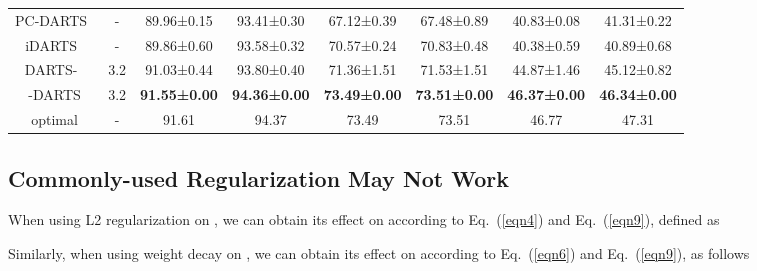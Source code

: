 \documentclass[10pt,twocolumn,letterpaper]{article}
\begin{document}
\begin{table*}[t]
\begin{center}
\begin{tabular}{cccccccc}
PC-DARTS~\cite{pc-darts}                 & -                                                                       & 89.96±0.15          & 93.41±0.30          & 67.12±0.39          & 67.48±0.89          & 40.83±0.08          & 41.31±0.22          \\
iDARTS~\cite{idarts}                   & -                                                                       & 89.86±0.60          & 93.58±0.32          & 70.57±0.24          & 70.83±0.48          & 40.38±0.59          & 40.89±0.68          \\
DARTS-~\cite{darts-}                   & 3.2                                                                     & 91.03±0.44          & 93.80±0.40          & 71.36±1.51          & 71.53±1.51          & 44.87±1.46          & 45.12±0.82          \\
-DARTS               & 3.2                                                                     & \textbf{91.55±0.00} & \textbf{94.36±0.00} & \textbf{73.49±0.00} & \textbf{73.51±0.00} & \textbf{46.37±0.00} & \textbf{46.34±0.00} \\
optimal                  & -                                                                       & 91.61               & 94.37               & 73.49               & 73.51               & 46.77               & 47.31               \\ \hline
\end{tabular}
\end{center}
\vspace{-12pt}
\end{table*}


\subsection{Commonly-used Regularization May Not Work} \label{sec:alpha-beta}
When using L2 regularization on , we can obtain its effect on  according to Eq.~(\ref{eqn4}) and Eq.~(\ref{eqn9}), defined as


Similarly, when using weight decay on , we can obtain its effect on  according to Eq.~(\ref{eqn6}) and Eq.~(\ref{eqn9}), as follows
\end{document}
